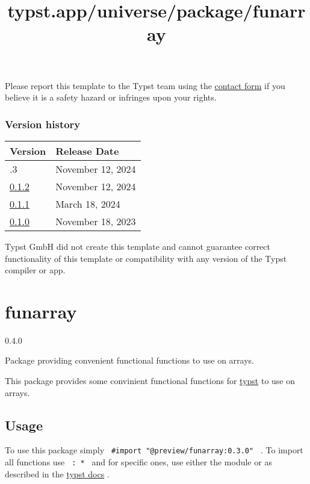 Please report this template to the Typst team using the
\href{https://typst.app/contact}{contact form} if you believe it is a
safety hazard or infringes upon your rights.

\label{versions}
\subsubsection{Version history}\label{version-history}

\begin{longtable}[]{@{}ll@{}}
\toprule\noalign{}
Version & Release Date \\
\midrule\noalign{}
\endhead
\bottomrule\noalign{}
\endlastfoot
0.1.3 & November 12, 2024 \\
\href{https://typst.app/universe/package/slydst/0.1.2/}{0.1.2} &
November 12, 2024 \\
\href{https://typst.app/universe/package/slydst/0.1.1/}{0.1.1} & March
18, 2024 \\
\href{https://typst.app/universe/package/slydst/0.1.0/}{0.1.0} &
November 18, 2023 \\
\end{longtable}

Typst GmbH did not create this template and cannot guarantee correct
functionality of this template or compatibility with any version of the
Typst compiler or app.


\title{typst.app/universe/package/funarray}

\label{banner}
\section{funarray}\label{funarray}

{ 0.4.0 }

Package providing convenient functional functions to use on arrays.

\label{readme}
This package provides some convinient functional functions for
\href{https://typst.app/}{typst} to use on arrays.

\subsection{Usage}\label{usage}

To use this package simply
\texttt{\ \#import\ "@preview/funarray:0.3.0"\ } . To import all
functions use \texttt{\ :\ *\ } and for specific ones, use either the
module or as described in the
\href{https://typst.app/docs/reference/scripting\#modules}{typst docs} .

